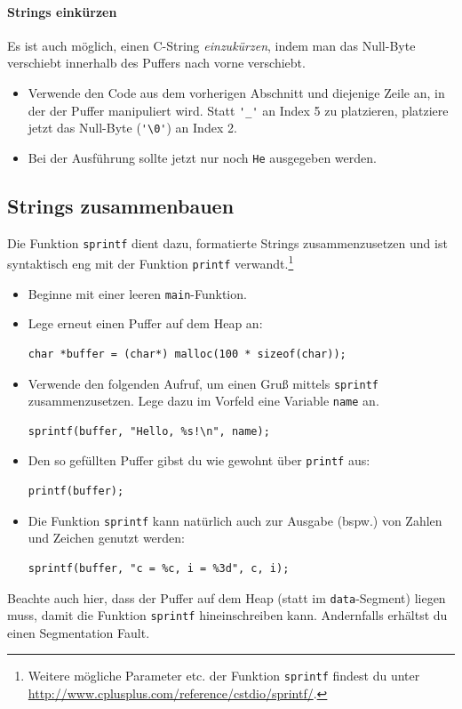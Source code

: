\paragraph{Strings einkürzen}
Es ist auch möglich, einen C-String \emph{einzukürzen}, indem man das Null-Byte verschiebt innerhalb des Puffers nach vorne verschiebt.
\begin{itemize}
\item
Verwende den Code aus dem vorherigen Abschnitt und diejenige Zeile an, in der der Puffer manipuliert wird.
Statt \lstinline|'_'| an Index 5 zu platzieren, platziere jetzt das Null-Byte (\lstinline|'\0'|) an Index 2.
\item 
Bei der Ausführung sollte jetzt nur noch \texttt{He} ausgegeben werden.
\end{itemize}

\subsection{Strings zusammenbauen}

Die Funktion \lstinline{sprintf} dient dazu, formatierte Strings zusammenzusetzen und ist syntaktisch eng mit der Funktion \lstinline{printf} verwandt.\footnote{Weitere mögliche Parameter etc. der Funktion \lstinline{sprintf} findest du unter \url{http://www.cplusplus.com/reference/cstdio/sprintf/}.}
%
\begin{itemize}
\item
Beginne mit einer leeren \lstinline|main|-Funktion.
\item 
Lege erneut einen Puffer auf dem Heap an:

\begin{minipage}{.96\textwidth}
\begin{lstlisting}
char *buffer = (char*) malloc(100 * sizeof(char));
\end{lstlisting}
\end{minipage}

\item 
Verwende den folgenden Aufruf, um einen Gruß mittels \lstinline|sprintf| zusammenzusetzen.
Lege dazu im Vorfeld eine Variable \lstinline|name| an.
\begin{lstlisting}
sprintf(buffer, "Hello, %s!\n", name);
\end{lstlisting}
\item 
Den so gefüllten Puffer gibst du wie gewohnt über \lstinline|printf| aus:
\begin{lstlisting}
printf(buffer);
\end{lstlisting}
\item 
Die Funktion \lstinline|sprintf| kann natürlich auch zur Ausgabe (bspw.) von Zahlen und Zeichen genutzt werden:
\begin{lstlisting}
sprintf(buffer, "c = %c, i = %3d", c, i);
\end{lstlisting}
\end{itemize}
Beachte auch hier, dass der Puffer auf dem Heap (statt im \texttt{data}-Segment) liegen muss, damit die Funktion \lstinline|sprintf| hineinschreiben kann.
Andernfalls erhältst du einen Segmentation Fault.


